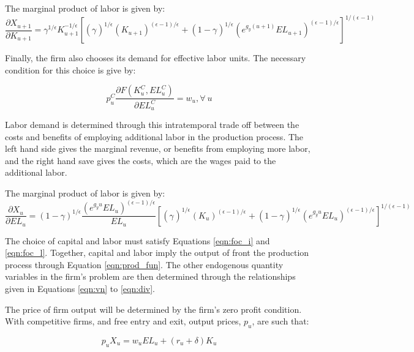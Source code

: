 \noindent\noindent The marginal product of labor is given by:
\begin{equation}
\label{eqn:mpk}
\frac{\partial X_{u+1}}{\partial K_{u+1}} =  \gamma^{1/\epsilon}K_{u+1}^{-1/\epsilon}\left[(\gamma_{})^{1/\epsilon_{}}(K_{u+1})^{(\epsilon-1)/\epsilon_{}}+(1-\gamma_{})^{1/\epsilon_{}}(e^{g_{y}(u+1)}EL_{u+1})^{(\epsilon_{}-1)/\epsilon_{}}\right]^{1/(\epsilon_{}-1)}
\end{equation}


Finally, the firm also chooses its demand for effective labor units.  The necessary condition for this choice is give by:

\begin{equation}
\label{eqn:foc_l}
p^{C}_{u}\frac{\partial F(K^{C}_{u},EL^{C}_{u})}{\partial EL^{C}_{u}}=w_{u}, \forall \ u
\end{equation}

\noindent\noindent Labor demand is determined through this intratemporal trade off between the costs and benefits of employing additional labor in the production process.  The left hand side gives the marginal revenue, or benefits from employing more labor, and the right hand save gives the costs, which are the wages paid to the additional labor.

\noindent\noindent The marginal product of labor is given by:
\begin{equation}
\label{eqn:mpk}
\frac{\partial X_{u}}{\partial EL_{u}} =  (1-\gamma)^{1/\epsilon}\frac{(e^{g_{y}u}EL_{u})^{(\epsilon-1)/\epsilon}}{EL_{u}}\left[(\gamma_{})^{1/\epsilon_{}}(K_{u})^{(\epsilon-1)/\epsilon_{}}+(1-\gamma_{})^{1/\epsilon_{}}(e^{g_{y}u}EL_{u})^{(\epsilon_{}-1)/\epsilon_{}}\right]^{1/(\epsilon_{}-1)}
\end{equation}

The choice of capital and labor must satisfy Equations \ref{eqn:foc_i} and \ref{eqn:foc_l}.  Together, capital and labor imply the output of front the production process through Equation \ref{eqn:prod_fun}.  The other endogenous quantity variables in the firm's problem are then determined through the relationships given in Equations \ref{eqn:vn} to \ref{eqn:div}.

The price of firm output will be determined by the firm's zero profit condition.  With competitive firms, and free entry and exit, output prices, $p_{u}$, are such that:

\begin{equation}
p_{u}X_{u}=w_{u}EL_{u}+(r_{u}+\delta)K_{u}
\end{equation}

